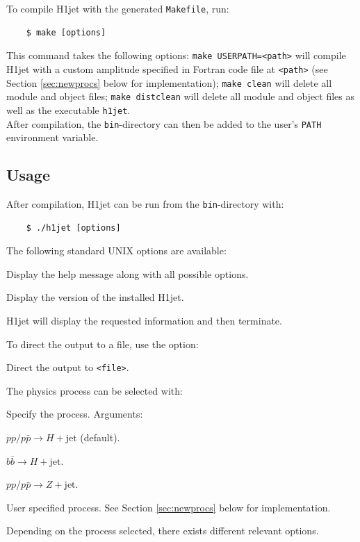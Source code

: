 \documentclass[12pt,a4wide]{article}
\begin{document}
To compile H1jet with the generated \texttt{Makefile}, run: 
\begin{lstlisting}
	$ make [options] 
\end{lstlisting}
This command takes the following options: \texttt{make USERPATH=<path>} will compile H1jet with a custom amplitude specified in Fortran code file at \texttt{<path>} (see Section \ref{sec:newprocs} below for implementation); \texttt{make clean} will delete all module and object files; \texttt{make distclean} will delete all module and object files as well as the executable \texttt{h1jet}. \\ 

After compilation, the \texttt{bin}-directory can then be added to the user's \texttt{PATH} environment variable. 

\subsection{Usage} 
After compilation, H1jet can be run from the \texttt{bin}-directory with: 
\begin{lstlisting}
	$ ./h1jet [options]  
\end{lstlisting}
The following standard UNIX options are available: 
\begin{description}[labelindent=\parindent, labelwidth =\widthof{\bfseries9999999999999999999999}, leftmargin = !] 
	\item[\texttt{-h, --help}] Display the help message along with all possible options. 
	\item[\texttt{-v, --version}] Display the version of the installed H1jet. 
\end{description}
H1jet will display the requested information and then terminate. 

To direct the output to a file, use the option:
\begin{description}[labelindent=\parindent, labelwidth =\widthof{\bfseries9999999999999999999999}, leftmargin = !] 
	\item[\texttt{-o, --out <file>}] Direct the output to \texttt{<file>}. 
\end{description}
The physics process can be selected with: 
\begin{description}[labelindent=\parindent, labelwidth =\widthof{\bfseries9999999999999999999999}, leftmargin = !] 
	\item[\texttt{--proc <arg>}] Specify the process. Arguments: \vspace{-2mm} 
	\begin{description}[labelwidth =\widthof{\bfseries99999}, leftmargin = !] 
		\item[\texttt{H}] $pp/p\bar{p} \rightarrow H + \text{jet}$ (default). 
		\item[\texttt{bbH}] $b\bar{b} \rightarrow H + \text{jet}$. 
		\item[\texttt{Z}] $pp/p\bar{p} \rightarrow Z + \text{jet}$. 
		\item[\texttt{user}] User specified process. See Section \ref{sec:newprocs} below for implementation. 
	\end{description}
\end{description}
Depending on the process selected, there exists different relevant options. 
\end{document}
